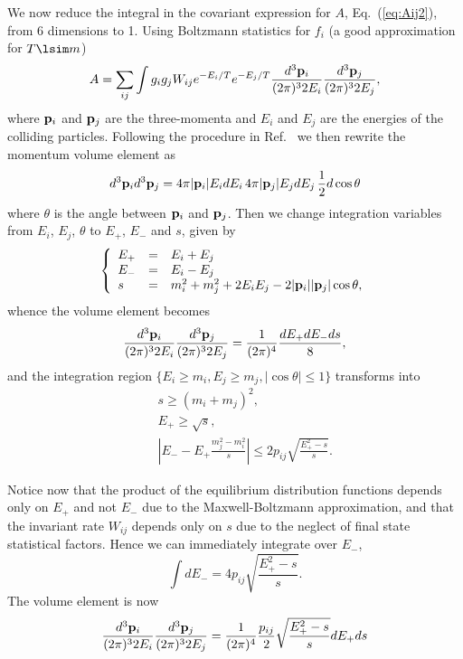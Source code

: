 We now reduce the integral in the covariant expression for $A$,
Eq.~(\ref{eq:Aij2}), from 6 dimensions to 1.
Using Boltzmann statistics for $f_i$ (a good approximation for
$T\lsim m$)
\begin{equation} \label{eq:Aij2b}
  A =
  \sum_{ij} \int g_i g_j W_{ij} e^{-E_{i}/T} e^{-E_{j}/T} 
\frac{d^3{\bf p}_i}{(2\pi)^3 2E_i}
  \frac{d^3{\bf p}_j}{(2\pi)^3 2E_j} ,
\end{equation}
where ${\bf p}_{i}$ and ${\bf p}_{j}$ are the three-momenta and
$E_{i}$ and $E_{j}$ are the energies of the colliding particles.
Following the procedure in Ref.~\cite{Gondolo:1990dk} we then rewrite
the momentum volume element as
\begin{equation}
  d^3 {\bf p}_{i} d^3 {\bf p}_{j} = 4 \pi |{\bf p}_{i}| E_i dE_{i}
  \, 4 \pi |{\bf p}_{j}| E_j dE_{j} \, \frac{1}{2} d \cos \theta
\end{equation}
where $\theta$ is the angle between ${\bf p}_{i}$ and 
${\bf p}_{j}$. Then we change integration variables from 
$E_{i}$, $E_{j}$, $\theta$ to $E_{+}$, $E_{-}$ and $s$, given by
\begin{equation}
  \left\{ \begin{array}{lcl}
  E_{+} & = & E_{i}+E_{j} \\
  E_{-} & = & E_{i}-E_{j} \\
  s & = & m_{i}^2+m_{j}^2 + 2E_{i}E_{j}-2 |{\bf p}_{i}| |{\bf
    p}_{j}| \cos \theta,
  \end{array} \right.
\end{equation}
whence the volume element becomes
\begin{equation}
  \frac{d^3{\bf p}_i}{(2\pi)^3 2E_i} \frac{d^3{\bf p}_j}{(2\pi)^3 2E_j} =
  \frac{1}{(2\pi)^4} \frac{dE_{+}dE_{-}ds}{8},
\end{equation}
and the integration region $\{ E_i \geq m_i, E_j \geq m_j, |\cos \theta| 
\leq
1\}$ transforms into 
\begin{eqnarray}
  && s \geq (m_i+m_j)^2, \\ && E_{+} \geq \sqrt{s} , \\ && \left\vert
  E_{-} - E_{+} \frac{m_j^2-m_i^2}{s} \right\vert \leq 2 p_{ij}
  \sqrt{\frac{E_{+}^2-s}{s}}.
\end{eqnarray}

Notice now that the product of the equilibrium distribution
functions depends only on $E_{+}$ and not $E_{-}$ due to the
Maxwell-Boltzmann approximation, and that the invariant rate
$W_{ij}$ depends only on $s$ due to the neglect of final state
statistical factors. Hence we can immediately integrate over
$E_{-}$,
\begin{equation}
  \int dE_{-} = 4p_{ij} \sqrt{\frac{E_{+}^2-s}{s}}.
\end{equation}
The volume element is now
\begin{equation}
  \frac{d^3{\bf p}_i}{(2\pi)^3 2E_i} \frac{d^3{\bf p}_j}{(2\pi)^3 2E_j} = 
  \frac{1}{(2\pi)^4} \frac{p_{ij}}{2} \sqrt{\frac{E_{+}^2-s}{s}} 
dE_{+} ds 
\end{equation}


